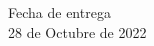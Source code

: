 \begin{titlepage}
\begin{center}
\vfill

{\large
Fecha de entrega\\
28 de Octubre de 2022 \\
\vspace{1.5cm}
}
\vfill
\end{center}
\end{titlepage}
\restoregeometry
